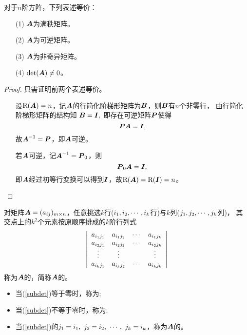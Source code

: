 \begin{frame}
\begin{dingli}
  对于$n$阶方阵，下列表述等价：
  \begin{itemize}
  \item[(1)] $\boldsymbol{A}$为满秩矩阵。
  \item[(2)] $\boldsymbol{A}$为可逆矩阵。
  \item[(3)] $\boldsymbol{A}$为非奇异矩阵。
  \item[(4)] $\mathrm{det}(\boldsymbol{A})\ne 0$。
  \end{itemize}
\end{dingli} \pause 
\begin{proof}
只需证明前两个表述等价。 
\begin{itemize}
\item [\red{(1)$\Rightarrow$(2)}]    
  设$\mathrm{R}(\boldsymbol{A})=n$，记$\boldsymbol{A}$的行简化阶梯形矩阵为$\boldsymbol{B}$，则$\boldsymbol{B}$有$n$个非零行， 由行简化阶梯形矩阵的结构知
  $
  \boldsymbol{B}=\boldsymbol{I},
  $ 
  即存在可逆矩阵$\boldsymbol{P}$使得
  $$
  \boldsymbol{P}\boldsymbol{A}=\boldsymbol{I},
  $$
  故$\boldsymbol{A}^{-1}=\boldsymbol{P}$，即$\boldsymbol{A}$可逆。 \pause 
\item [\red{(2)$\Rightarrow$(1)}]   
  若$\boldsymbol{A}$可逆，记$\boldsymbol{A}^{-1}=\boldsymbol{P}_0$，则
  $$
  \boldsymbol{P}_0\boldsymbol{A}=\boldsymbol{I},
  $$ 
  即$\boldsymbol{A}$经过初等行变换可以得到$\boldsymbol{I}$，故$\mathrm{R}(\boldsymbol{A})=\mathrm{R}(\boldsymbol{I})=n$。
\end{itemize}
\end{proof}
\end{frame}

\begin{frame}
\begin{dingyi}[子式与主子式]
  对矩阵$\boldsymbol{A}=(a_{ij})_{m\times n}$，任意挑选$k$行($i_1,i_2,\cdots,i_k$行)与$k$列($j_1,j_2,\cdots,j_k$列)，
  其交点上的$k^2$个元素按原顺序排成的$k$阶行列式
  \begin{equation}\label{subdet}
    \left|
      \begin{array}{cccc}
        a_{i_1j_1} & a_{i_1j_2} & \cdots & a_{i_1j_k}\\
        a_{i_2j_1} & a_{i_2j_2} & \cdots & a_{i_2j_k}\\
        \vdots & \vdots && \vdots\\
        a_{i_kj_1} & a_{i_kj_2} & \cdots & a_{i_kj_k}\\
      \end{array}
    \right|
  \end{equation}
  称为$\boldsymbol{A}$的，简称$\boldsymbol{A}$的。 
  \begin{itemize}
  \item 当(\ref{subdet})等于零时，称为;
  \item 当(\ref{subdet})不等于零时，称为;
  \item 当(\ref{subdet})的$j_1=i_1,~j_2=i_2,~\cdots,~j_k=i_k$，称为$\boldsymbol{A}$的。
  \end{itemize}
\end{dingyi}
\end{frame}

